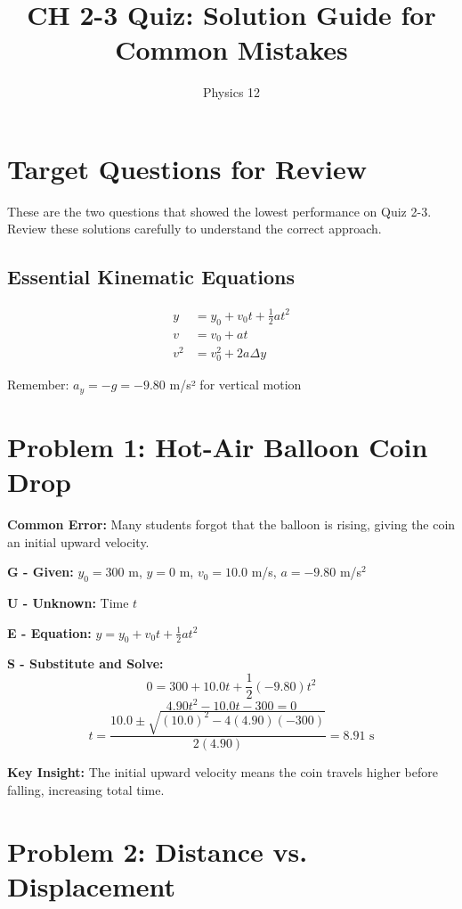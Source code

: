 \documentclass[12pt]{article}
\title{CH 2-3 Quiz: Solution Guide for Common Mistakes}
\author{Physics 12}
\date{}
\begin{document}
\maketitle

\section{Target Questions for Review}

These are the two questions that showed the lowest performance on Quiz 2-3. Review these solutions carefully to understand the correct approach.

\subsection{Essential Kinematic Equations}

\begin{align}
y &= y_0 + v_0 t + \frac{1}{2}at^2 \tag{4}\\
v &= v_0 + at \tag{1}\\
v^2 &= v_0^2 + 2a\Delta y \tag{3}
\end{align}

Remember: $a_y = -g = -9.80$ m/s² for vertical motion

\section{Problem 1: Hot-Air Balloon Coin Drop}

\textbf{Common Error:} Many students forgot that the balloon is rising, giving the coin an initial upward velocity.

\textbf{G - Given:} $y_0 = 300$ m, $y = 0$ m, $v_0 = 10.0$ m/s, $a = -9.80$ m/s$^2$

\textbf{U - Unknown:} Time $t$

\textbf{E - Equation:} $y = y_0 + v_0 t + \frac{1}{2}at^2$

\textbf{S - Substitute and Solve:}
$$0 = 300 + 10.0t + \frac{1}{2}(-9.80)t^2$$
$$4.90t^2 - 10.0t - 300 = 0$$
$$t = \frac{10.0 \pm \sqrt{(10.0)^2 - 4(4.90)(-300)}}{2(4.90)} = \boxed{8.91 \text{ s}}$$

\textbf{Key Insight:} The initial upward velocity means the coin travels higher before falling, increasing total time.

\section{Problem 2: Distance vs. Displacement}
\end{document}
